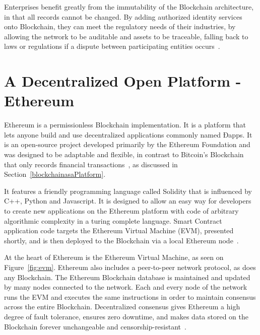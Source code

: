 Enterprises benefit greatly from the immutability of the Blockchain
architecture, in that all records cannot be changed. By adding authorized
identity services onto Blockchain, they can meet the regulatory needs of their
industries, by allowing the network to be auditable and assets to be traceable,
falling back to laws or regulations if a dispute between participating entities
occurs~\cite{Barclay2017}.

\section{A Decentralized Open Platform - Ethereum} \label{ethereumPlatform}

Ethereum is a permissionless Blockchain implementation. It is a platform that
lets anyone build and use decentralized applications commonly named Ðapps. It
is an open-source project developed primarily by the Ethereum Foundation and
was designed to be adaptable and flexible, in contrast to Bitcoin's Blockchain
that only records financial transactions~\cite{EthereumDocs2018}, as discussed
in Section~\ref{blockchainasaPlatform}.

It features a friendly programming language called Solidity that is influenced
by C++, Python and Javascript. It is designed to allow an easy way for
developers to create new applications on the Ethereum platform with code of
arbitrary algorithmic complexity in a turing complete language. Smart Contract
application code targets the Ethereum Virtual Machine (EVM), presented shortly,
and is then deployed to the Blockchain via a local Ethereum
node~\cite{Wood2017,Barclay2017}.

At the heart of Ethereum is the Ethereum Virtual Machine, as seen on
Figure~\ref{fig:evm}. Ethereum also includes a peer-to-peer network protocol,
as does any Blockchain. The Ethereum Blockchain database is maintained and
updated by many nodes connected to the network. Each and every node of the
network runs the EVM and executes the same instructions in order to maintain
consensus across the entire Blockchain. Decentralized consensus gives Ethereum
a high degree of fault tolerance, ensures zero downtime, and makes data stored
on the Blockchain forever unchangeable and
censorship-resistant~\cite{EthereumDocs2018}.

